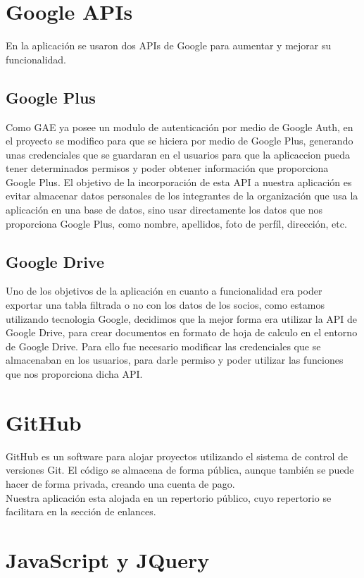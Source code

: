 \section{Google APIs}
\label{2:sec4}

En la aplicación se usaron dos APIs de Google para aumentar y mejorar su funcionalidad. 


\subsection{Google Plus}
Como GAE ya posee un modulo de autenticación por medio de Google Auth,
en el proyecto se modifico para que se hiciera por medio de Google Plus, generando unas credenciales que se guardaran en el usuarios
para que la aplicaccion pueda tener determinados permisos y poder obtener información que proporciona Google Plus. El objetivo de la incorporación de esta 
API a nuestra aplicación es evitar almacenar datos personales de los integrantes de la organización que usa la aplicación en una base de datos, sino usar directamente los
datos que nos proporciona Google Plus, como nombre, apellidos, foto de perfíl, dirección, etc.

\subsection{Google Drive}
Uno de los objetivos de la aplicación en cuanto a funcionalidad era poder exportar una tabla filtrada o no con los datos de los socios, como estamos utilizando tecnologia Google,
decidimos que la mejor forma era utilizar la API de Google Drive, para crear documentos en formato de hoja de calculo en el entorno de Google Drive. Para ello fue necesario
modificar las credenciales que se almacenaban en los usuarios, para darle permiso y poder utilizar las funciones que nos proporciona dicha API.

\section{GitHub}
\label{2:sec5}
GitHub es un software para alojar proyectos utilizando el sistema de control de versiones Git. 
El código se almacena de forma pública, aunque también se puede hacer de forma privada, creando una cuenta de pago.\\

Nuestra aplicación esta alojada en un repertorio público, cuyo repertorio se facilitara en la sección de enlances.

\section{JavaScript y JQuery}
\label{2:sec6}


